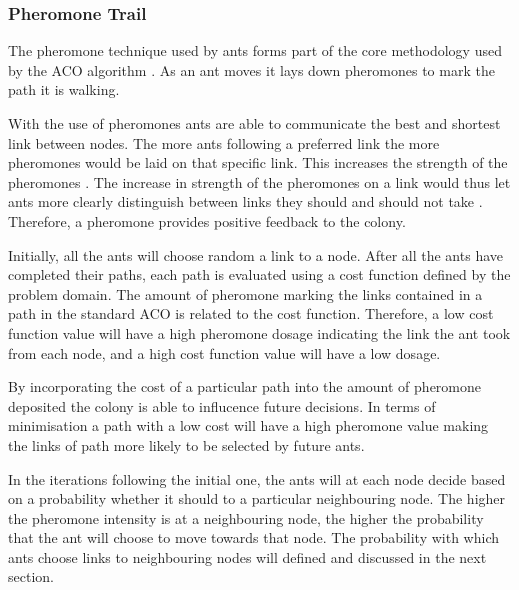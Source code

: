 \subsubsection{Pheromone Trail}
\label{sec:pheromonetrail}
The pheromone technique used by ants forms part of the core methodology used by the \gls{ACO} algorithm \cite{AntQAP}. As an ant moves it lays down pheromones to mark the path it is walking.

With the use of pheromones ants are able to communicate the best and shortest link between nodes\cite{AntQAP,AntsAndStigmergy,CompuIntelligenceIntro}. The more ants following a preferred link the more pheromones would be laid on that specific link. This increases the strength of the pheromones \cite{ImpACOComplex}. The increase in strength of the pheromones on a link would thus let ants more clearly distinguish between links they should and should not take \cite{ImpACOComplex}. Therefore, a pheromone provides positive feedback to the colony\cite{AntQAP,AntsAndStigmergy,CompuIntelligenceIntro}.

Initially, all the ants will choose random a link to a node\cite{AntQAP,AntsAndStigmergy,CompuIntelligenceIntro}. After all the ants have completed their paths, each path is evaluated using a cost function defined by the problem domain\cite{CompuIntelligenceIntro}. The amount of pheromone marking the links contained in a path in the standard \gls{ACO} is related to the cost function\cite{AntQAP,AntsAndStigmergy,CompuIntelligenceIntro}. Therefore, a low cost function value will have a high pheromone dosage indicating the link the ant took from each node, and a high cost function value will have a low dosage\cite{CompuIntelligenceIntro}. 


By incorporating the cost of a particular path into the amount of pheromone deposited the colony is able to influcence future decisions\cite{CompuIntelligenceIntro}. In terms of minimisation a path with a low cost will have a high pheromone value making the links of path more likely to be selected by future ants\cite{CompuIntelligenceIntro}.

In the iterations following the initial one, the ants will at each node decide based on a probability whether it should to a particular neighbouring node. The higher the pheromone intensity is at a neighbouring node, the higher the probability that the ant will choose to move towards that node\cite{AntQAP,AntsAndStigmergy,CompuIntelligenceIntro}. The probability with which ants choose links to neighbouring nodes will defined and discussed in the next section.

